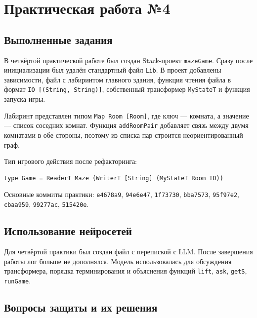 \section{Практическая работа №4}
\label{sec:pr4}

\subsection{Выполненные задания}

В четвёртой практической работе был создан Stack-проект \texttt{mazeGame}. Сразу после инициализации был удалён стандартный файл \texttt{Lib}. В проект добавлены зависимости, файл с лабиринтом главного здания, функция чтения файла в формат \texttt{IO [(String, String)]}, собственный трансформер \texttt{MyStateT} и функция запуска игры.

Лабиринт представлен типом \texttt{Map Room [Room]}, где ключ --- комната, а значение --- список соседних комнат. Функция \texttt{addRoomPair} добавляет связь между двумя комнатами в обе стороны, поэтому из списка пар строится неориентированный граф.

Тип игрового действия после рефакторинга:

\label{lst:game-type-pr4}
\begin{verbatim}
type Game = ReaderT Maze (WriterT [String] (MyStateT Room IO))
\end{verbatim}

Основные коммиты практики: \texttt{e4678a9}, \texttt{94e6e47}, \texttt{1f73730}, \texttt{bba7573}, \texttt{95f97e2}, \texttt{cbaa959}, \texttt{99277ac}, \texttt{515420e}.

\subsection{Использование нейросетей}

Для четвёртой практики был создан файл с перепиской с LLM. После завершения работы лог больше не дополнялся. Модель использовалась для обсуждения трансформера, порядка терминирования и объяснения функций \texttt{lift}, \texttt{ask}, \texttt{getS}, \texttt{runGame}.

\subsection{Вопросы защиты и их решения}


